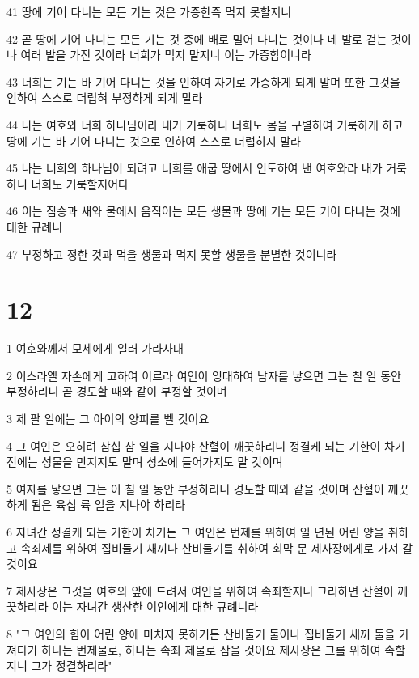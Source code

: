 \par 41 땅에 기어 다니는 모든 기는 것은 가증한즉 먹지 못할지니
\par 42 곧 땅에 기어 다니는 모든 기는 것 중에 배로 밀어 다니는 것이나 네 발로 걷는 것이나 여러 발을 가진 것이라 너희가 먹지 말지니 이는 가증함이니라
\par 43 너희는 기는 바 기어 다니는 것을 인하여 자기로 가증하게 되게 말며 또한 그것을 인하여 스스로 더럽혀 부정하게 되게 말라
\par 44 나는 여호와 너희 하나님이라 내가 거룩하니 너희도 몸을 구별하여 거룩하게 하고 땅에 기는 바 기어 다니는 것으로 인하여 스스로 더럽히지 말라
\par 45 나는 너희의 하나님이 되려고 너희를 애굽 땅에서 인도하여 낸 여호와라 내가 거룩하니 너희도 거룩할지어다
\par 46 이는 짐승과 새와 물에서 움직이는 모든 생물과 땅에 기는 모든 기어 다니는 것에 대한 규례니
\par 47 부정하고 정한 것과 먹을 생물과 먹지 못할 생물을 분별한 것이니라

\chapter{12}

\par 1 여호와께서 모세에게 일러 가라사대
\par 2 이스라엘 자손에게 고하여 이르라 여인이 잉태하여 남자를 낳으면 그는 칠 일 동안 부정하리니 곧 경도할 때와 같이 부정할 것이며
\par 3 제 팔 일에는 그 아이의 양피를 벨 것이요
\par 4 그 여인은 오히려 삼십 삼 일을 지나야 산혈이 깨끗하리니 정결케 되는 기한이 차기 전에는 성물을 만지지도 말며 성소에 들어가지도 말 것이며
\par 5 여자를 낳으면 그는 이 칠 일 동안 부정하리니 경도할 때와 같을 것이며 산혈이 깨끗하게 됨은 육십 륙 일을 지나야 하리라
\par 6 자녀간 정결케 되는 기한이 차거든 그 여인은 번제를 위하여 일 년된 어린 양을 취하고 속죄제를 위하여 집비둘기 새끼나 산비둘기를 취하여 회막 문 제사장에게로 가져 갈 것이요
\par 7 제사장은 그것을 여호와 앞에 드려서 여인을 위하여 속죄할지니 그리하면 산혈이 깨끗하리라 이는 자녀간 생산한 여인에게 대한 규례니라
\par 8 "그 여인의 힘이 어린 양에 미치지 못하거든 산비둘기 둘이나 집비둘기 새끼 둘을 가져다가 하나는 번제물로, 하나는 속죄 제물로 삼을 것이요 제사장은 그를 위하여 속할지니 그가 정결하리라"

